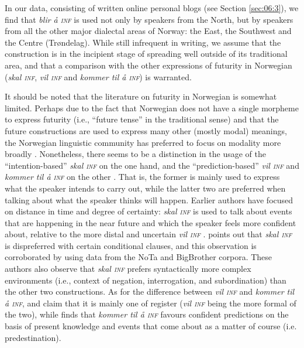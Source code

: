 \documentclass[output=paper,colorlinks,citecolor=brown]{langscibook}
\begin{document}
In our data, consisting of written online personal blogs (see Section \ref{sec:06:3}), we find that \textit{blir å \textsc{inf}} is used not only by speakers from the North, but by speakers from all the other major dialectal areas of Norway: the East, the Southwest and the Centre (Trøndelag). While still infrequent in writing, we assume that the construction is in the incipient stage of spreading well outside of its traditional area, and that a comparison with the other expressions of futurity in Norwegian (\textit{skal \textsc{inf}}, \textit{vil \textsc{inf}} and \textit{kommer til å \textsc{inf}}) is warranted.

It should be noted that the literature on futurity in Norwegian is somewhat limited. Perhaps due to the fact that Norwegian does not have a single morpheme to express futurity (i.e., “future tense” in the traditional sense) and that the future constructions are used to express many other (mostly modal) meanings, the Norwegian linguistic community has preferred to focus on modality more broadly \citep{eide2020}. Nonetheless, there seems to be a distinction in the usage of the “intention-based” \textit{skal \textsc{inf}} on the one hand, and the “prediction-based” \textit{vil \textsc{inf}} and \textit{kommer til å \textsc{inf}} on the other \citep{Dahl2000}. That is, the former is mainly used to express what the speaker intends to carry out, while the latter two are preferred when talking about what the speaker thinks will happen. Earlier authors have focused on distance in time and degree of certainty: \textit{skal \textsc{inf}} is used to talk about events that are happening in the near future and which the speaker feels more confident about, relative to the more distal and uncertain \textit{vil \textsc{inf}} \citep{macdonald1982}. \citet{lie2005} points out that \textit{skal \textsc{inf}} is dispreferred with certain conditional clauses, and this observation is corroborated by \citet{mikkelsenhartmann2022} using data from the NoTa and BigBrother corpora. These authors also observe that \textit{skal \textsc{inf}} prefers syntactically more complex environments (i.e., context of negation, interrogation, and subordination) than the other two constructions. As for the difference between \textit{vil \textsc{inf}} and \textit{kommer til å \textsc{inf}}, \citet{macdonald1982} and \citet{vannebo1985} claim that it is mainly one of register (\textit{vil \textsc{inf}} being the more formal of the two), while \citet{hasselgård2015} finds that \textit{kommer til å \textsc{inf}} favours confident predictions on the basis of present knowledge and events that come about as a matter of course (i.e. predestination).
\end{document}
